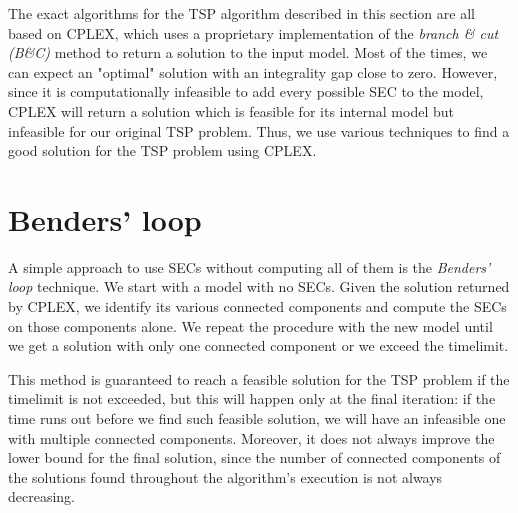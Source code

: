 The exact algorithms for the TSP algorithm described in this section are all based on CPLEX, which uses a proprietary implementation of the \textit{branch \& cut (B\&C)} method to return a solution to the input model. Most of the times, we can expect an "optimal" solution with an integrality gap close to zero. However, since it is computationally infeasible to add every possible SEC to the model, CPLEX will return a solution which is feasible for its internal model but infeasible for our original TSP problem. Thus, we use various techniques to find a good solution for the TSP problem using CPLEX.

\section{Benders' loop}
A simple approach to use SECs without computing all of them is the \textit{Benders' loop} technique. We start with a model with no SECs. Given the solution returned by CPLEX, we identify its various connected components and compute the SECs on those components alone. We repeat the procedure with the new model until we get a solution with only one connected component or we exceed the timelimit.

This method is guaranteed to reach a feasible solution for the TSP problem if the timelimit is not exceeded, but this will happen only at the final iteration: if the time runs out before we find such feasible solution, we will have an infeasible one with multiple connected components. Moreover, it does not always improve the lower bound for the final solution, since the number of connected components of the solutions found throughout the algorithm's execution is not always decreasing.
\newpage
\FloatBarrier
